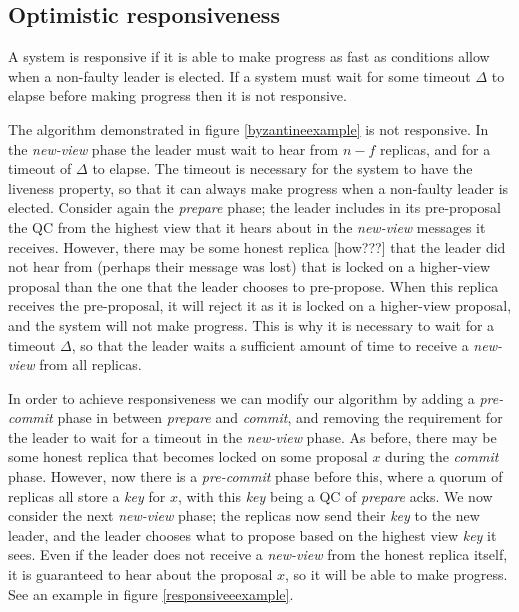 \subsection{Optimistic responsiveness}
A system is responsive if it is able to make progress as fast as conditions allow when a non-faulty leader is elected. If a system must wait for some timeout $\Delta$ to elapse before making progress then it is not responsive.

The algorithm demonstrated in figure \ref{byzantineexample} is not responsive. In the \textit{new-view} phase the leader must wait to hear from $n - f$ replicas, and for a timeout of $\Delta$ to elapse. The timeout is necessary for the system to have the liveness property, so that it can always make progress when a non-faulty leader is elected. Consider again the \textit{prepare} phase; the leader includes in its pre-proposal the QC from the highest view that it hears about in the \textit{new-view} messages it receives. However, there may be some honest replica [how???] that the leader did not hear from (perhaps their message was lost) that is locked on a higher-view proposal than the one that the leader chooses to pre-propose. When this replica receives the pre-proposal, it will reject it as it is locked on a higher-view proposal, and the system will not make progress. This is why it is necessary to wait for a timeout $\Delta$, so that the leader waits a sufficient amount of time to receive a \textit{new-view} from all replicas.

In order to achieve responsiveness we can modify our algorithm by adding a \textit{pre-commit} phase in between \textit{prepare} and \textit{commit}, and removing the requirement for the leader to wait for a timeout in the \textit{new-view} phase. As before, there may be some honest replica that becomes locked on some proposal $x$ during the \textit{commit} phase. However, now there is a \textit{pre-commit} phase before this, where a quorum of replicas all store a \textit{key} for $x$, with this \textit{key} being a QC of \textit{prepare} acks. We now consider the next \textit{new-view} phase; the replicas now send their \textit{key} to the new leader, and the leader chooses what to propose based on the highest view \textit{key} it sees. Even if the leader does not receive a \textit{new-view} from the honest replica itself, it is guaranteed to hear about the proposal $x$, so it will be able to make progress. See an example in figure \ref{responsiveeexample}.


